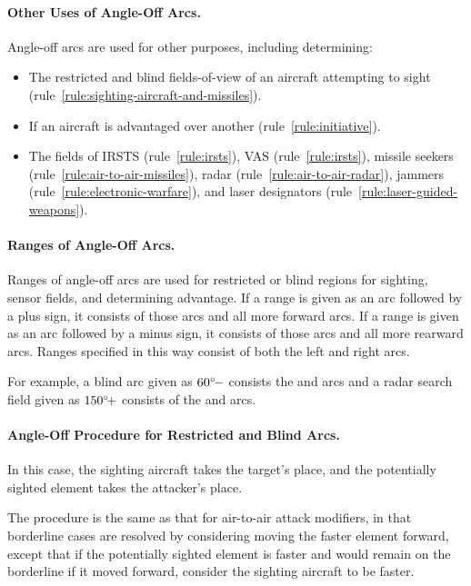 {\paragraph{Other Uses of Angle-Off Arcs.}
Angle-off arcs are used for other purposes, including determining:
\begin{itemize}
    \item The restricted and blind fields-of-view of an aircraft attempting to sight (rule~\ref{rule:sighting-aircraft-and-missiles}).
    \item If an aircraft is advantaged over another (rule~\ref{rule:initiative}).
    \item The fields of IRSTS (rule~\ref{rule:irsts}), VAS (rule~\ref{rule:irsts}), missile seekers (rule~\ref{rule:air-to-air-missiles}), radar (rule~\ref{rule:air-to-air-radar}), jammers (rule~\ref{rule:electronic-warfare}), and laser designators (rule~\ref{rule:laser-guided-weapons}).
\end{itemize}

\paragraph{Ranges of Angle-Off Arcs.}
\label{rule:ranges-of-angle-off-arcs}
Ranges of angle-off arcs are used for restricted or blind regions for sighting, sensor fields, and determining advantage. If a range is given as an arc followed by a plus sign, it consists of those arcs and all more forward arcs. If a range is given as an arc followed by a minus sign, it consists of those arcs and all more rearward arcs. Ranges specified in this way consist of both the left and right arcs.

For example, a blind arc given as $\mbox{$60{^\circ}\!-$}$ consists the  and  arcs and a radar search field given as $\mbox{$150{^\circ}\!+$}$ consists of the  and  arcs. 

\paragraph{Angle-Off Procedure for Restricted and Blind Arcs.}
In this case, the sighting aircraft takes the target's place, and the potentially sighted element takes the attacker's place. 

The procedure is the same as that for air-to-air attack modifiers, in that borderline cases are resolved by considering moving the faster element forward, except that if the potentially sighted element is faster and would remain on the borderline if it moved forward, consider the sighting aircraft to be faster.

}
